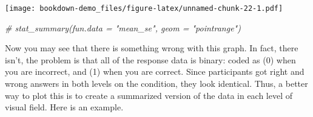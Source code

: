 \documentclass[]{book}
\newenvironment{Shaded}{\begin{snugshade}}{\end{snugshade}}
\newcommand{\KeywordTok}[1]{\textcolor[rgb]{0.13,0.29,0.53}{\textbf{#1}}}
\newcommand{\DataTypeTok}[1]{\textcolor[rgb]{0.13,0.29,0.53}{#1}}
\newcommand{\DecValTok}[1]{\textcolor[rgb]{0.00,0.00,0.81}{#1}}
\newcommand{\StringTok}[1]{\textcolor[rgb]{0.31,0.60,0.02}{#1}}
\newcommand{\CommentTok}[1]{\textcolor[rgb]{0.56,0.35,0.01}{\textit{#1}}}
\newcommand{\OperatorTok}[1]{\textcolor[rgb]{0.81,0.36,0.00}{\textbf{#1}}}
\newcommand{\NormalTok}[1]{#1}
\begin{document}
\begin{Shaded}
\end{Shaded}

\texttt{[image: bookdown-demo\_files/figure-latex/unnamed-chunk-22-1.pdf]}

\begin{Shaded}
\begin{Highlighting}[]
\CommentTok{# stat_summary(fun.data = "mean_se", geom = "pointrange")}
\end{Highlighting}
\end{Shaded}

Now you may see that there is something wrong with this graph. In fact,
there isn't, the problem is that all of the response data is binary:
coded as (0) when you are incorrect, and (1) when you are correct. Since
participants got right and wrong answers in both levels on the
condition, they look identical. Thus, a better way to plot this is to
create a summarized version of the data in each level of visual field.
Here is an example.

\begin{Shaded}
\end{Shaded}
\end{document}
